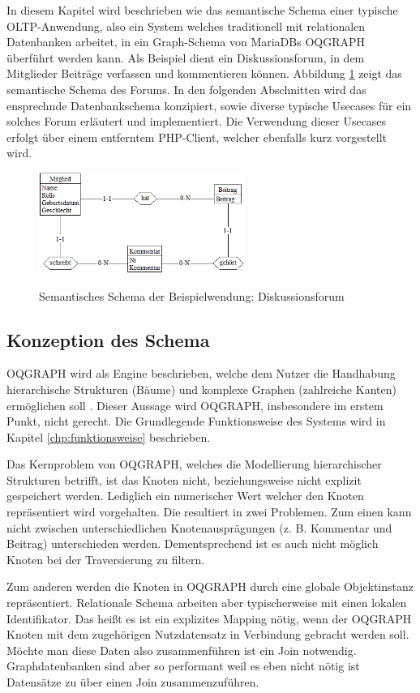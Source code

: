 In diesem Kapitel wird beschrieben wie das semantische Schema einer typische OLTP-Anwendung, also ein System welches traditionell mit relationalen Datenbanken arbeitet, in ein Graph-Schema von MariaDBs OQGRAPH überführt werden kann. Als Beispiel dient ein Diskussionsforum, in dem Mitglieder Beiträge verfassen und kommentieren können. Abbildung \ref{fig:semanticSchema} zeigt das semantische Schema des Forums. In den folgenden Abschnitten wird das ensprechnde Datenbankschema konzipiert, sowie diverse typische Usecases für ein solches Forum erläutert und implementiert. Die Verwendung dieser Usecases erfolgt über einem entferntem PHP-Client, welcher ebenfalls kurz vorgestellt wird.

\begin{figure}
	\caption{Semantisches Schema der Beispielwendung: Diskussionsforum}
	\centering
	\includegraphics[width=0.6\textwidth]{images/semantischesSchema.png}
	\label{fig:semanticSchema}
\end{figure}

\subsection{Konzeption des Schema}
OQGRAPH wird als Engine beschrieben, welche dem Nutzer die Handhabung hierarchische Strukturen (Bäume) und komplexe Graphen (zahlreiche Kanten) ermöglichen soll \cite{oqgraph}. Dieser Aussage wird OQGRAPH, insbesondere im erstem Punkt, nicht gerecht. Die Grundlegende Funktionsweise des Systems wird in Kapitel \ref{chp:funktionsweise} beschrieben.

Das Kernproblem von OQGRAPH, welches die Modellierung hierarchischer Strukturen betrifft, ist das Knoten nicht, beziehungsweise nicht explizit gespeichert werden. Lediglich ein numerischer Wert welcher den Knoten repräsentiert wird vorgehalten. Die resultiert in zwei Problemen. Zum einen kann nicht zwischen unterschiedlichen Knotenausprägungen (z. B. Kommentar und Beitrag) unterschieden werden. Dementsprechend ist es auch nicht möglich Knoten bei der Traversierung zu filtern. 

Zum anderen werden die Knoten in OQGRAPH durch eine globale Objektinstanz repräsentiert. Relationale Schema arbeiten aber typischerweise mit einen lokalen Identifikator. Das heißt es ist ein explizites Mapping nötig, wenn der OQGRAPH Knoten mit dem zugehörigen Nutzdatensatz in Verbindung gebracht werden soll. Möchte man diese Daten also zusammenführen ist ein Join notwendig. Graphdatenbanken sind aber so performant weil es eben nicht nötig ist Datensätze zu über einen Join zusammenzuführen.

